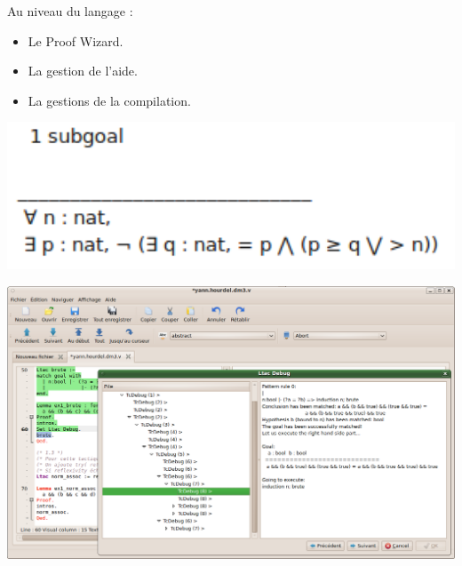 \begin{frame}

Au niveau du langage :

\begin{itemize}
    \item Le Proof Wizard.
    \item La gestion de l'aide.
    \item La gestions de la compilation.
\end{itemize}


\end{frame}



\begin{frame}
\includegraphics[width=1\textwidth]{../images/ide/unicode.png}
\end{frame}

\begin{frame}
\includegraphics[width=1\textwidth]{../images/ide/ltacdebug.png}
\end{frame}
